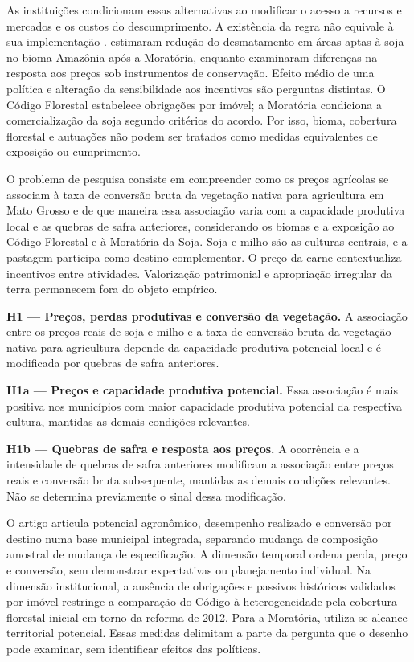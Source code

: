 As instituições condicionam essas alternativas ao modificar o acesso a recursos e mercados e os custos do descumprimento. A existência da regra não equivale à sua implementação \cite{North1991}.  estimaram redução do desmatamento em áreas aptas à soja no bioma Amazônia após a Moratória, enquanto  examinaram diferenças na resposta aos preços sob instrumentos de conservação. Efeito médio de uma política e alteração da sensibilidade aos incentivos são perguntas distintas. O Código Florestal estabelece obrigações por imóvel; a Moratória condiciona a comercialização da soja segundo critérios do acordo. Por isso, bioma, cobertura florestal e autuações não podem ser tratados como medidas equivalentes de exposição ou cumprimento.

O problema de pesquisa consiste em compreender como os preços agrícolas se associam à taxa de conversão bruta da vegetação nativa para agricultura em Mato Grosso e de que maneira essa associação varia com a capacidade produtiva local e as quebras de safra anteriores, considerando os biomas e a exposição ao Código Florestal e à Moratória da Soja. Soja e milho são as culturas centrais, e a pastagem participa como destino complementar. O preço da carne contextualiza incentivos entre atividades. Valorização patrimonial e apropriação irregular da terra permanecem fora do objeto empírico.

\noindent\textbf{H1 --- Preços, perdas produtivas e conversão da vegetação.} A associação entre os preços reais de soja e milho e a taxa de conversão bruta da vegetação nativa para agricultura depende da capacidade produtiva potencial local e é modificada por quebras de safra anteriores.

\noindent\textbf{H1a --- Preços e capacidade produtiva potencial.} Essa associação é mais positiva nos municípios com maior capacidade produtiva potencial da respectiva cultura, mantidas as demais condições relevantes.

\noindent\textbf{H1b --- Quebras de safra e resposta aos preços.} A ocorrência e a intensidade de quebras de safra anteriores modificam a associação entre preços reais e conversão bruta subsequente, mantidas as demais condições relevantes. Não se determina previamente o sinal dessa modificação.

O artigo articula potencial agronômico, desempenho realizado e conversão por destino numa base municipal integrada, separando mudança de composição amostral de mudança de especificação. A dimensão temporal ordena perda, preço e conversão, sem demonstrar expectativas ou planejamento individual. Na dimensão institucional, a ausência de obrigações e passivos históricos validados por imóvel restringe a comparação do Código à heterogeneidade pela cobertura florestal inicial em torno da reforma de 2012. Para a Moratória, utiliza-se alcance territorial potencial. Essas medidas delimitam a parte da pergunta que o desenho pode examinar, sem identificar efeitos das políticas.


